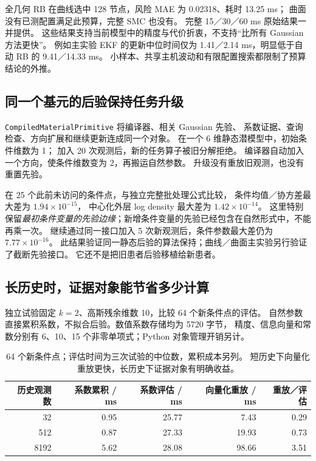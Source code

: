 \documentclass[11pt,a4paper]{article}
\numberwithin{equation}{section}
\theoremstyle{definition}
\begin{document}
全几何 RB 在曲线选中 128 节点，风险 MAE 为 0.02318、耗时 13.25 ms；
曲面没有已测配置满足此预算，完整 SMC 也没有。
完整 15／30／60 ms 原始结果一并提供。
这些结果支持当前模型中的精度与代价折衷，不支持“比所有 Gaussian 方法更快”。
例如主实验 EKF 的更新中位时间仅为 1.41／2.14 ms，明显低于自动 RB 的 9.41／14.33 ms。
小样本、共享主机波动和有限配置搜索都限制了预算结论的外推。

\subsection{同一个基元的后验保持任务升级}
\texttt{CompiledMaterialPrimitive} 将编译器、相关 Gaussian 先验、
系数证据、查询检查、方向扩展和继续更新连成同一个对象。
在一个 6 维静态潜模型中，初始条件维数为 1；
加入 20 次观测后，新的任务算子被旧分解拒绝。
编译器自动加入一个方向，使条件维数变为 2，再搬运自然参数。
升级没有重放旧观测，也没有重置先验。

在 25 个此前未访问的条件点，与独立完整批处理公式比较，
条件均值／协方差最大差为 \(1.94\times10^{-15}\)，
中心化外层 log density 最大差为 \(1.42\times10^{-14}\)。
这里特别保留\emph{最初条件变量的先验边缘}；新增条件变量的先验已经包含在自然形式中，不能再乘一次。
继续通过同一接口加入 5 次新观测后，条件参数最大差仍为 \(7.77\times10^{-16}\)。
此结果验证同一静态后验的算法保持；曲线／曲面主实验另行验证了截断先验接口。
它还不是把旧患者后验移植给新患者。

\subsection{长历史时，证据对象能节省多少计算}
独立试验固定 \(k=2\)、高斯残余维数 10，比较 64 个新条件点的评估。
自然参数直接累积系数，不拟合后验。数值系数存储均为 5720 字节，
精度、信息向量和常数分别有 6、10、15 个非零单项式；Python 对象管理开销另计。

\begin{table}[ht]
\centering\small
\begin{tabular}{rrrrr}
\toprule
历史观测数 & 系数累积 / ms & 系数评估 / ms & 向量化重放 / ms & 重放／评估\\
\midrule
32 & 0.95 & 25.77 & 7.43 & 0.29\\
512 & 0.87 & 27.33 & 19.93 & 0.73\\
8192 & 5.62 & 28.08 & 98.66 & 3.51\\
\bottomrule
\end{tabular}
\caption{64 个新条件点；评估时间为三次试验的中位数，累积成本另列。
短历史下向量化重放更快，长历史下证据对象有明确收益。}
\label{tab:evidence}
\end{table}
\end{document}
